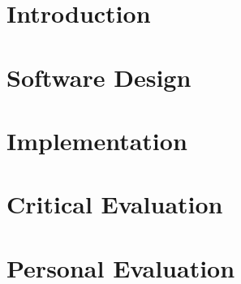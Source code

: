 \section{Introduction}


\section{Software Design}


\section{Implementation}


\section{Critical Evaluation}


\section{Personal Evaluation}

